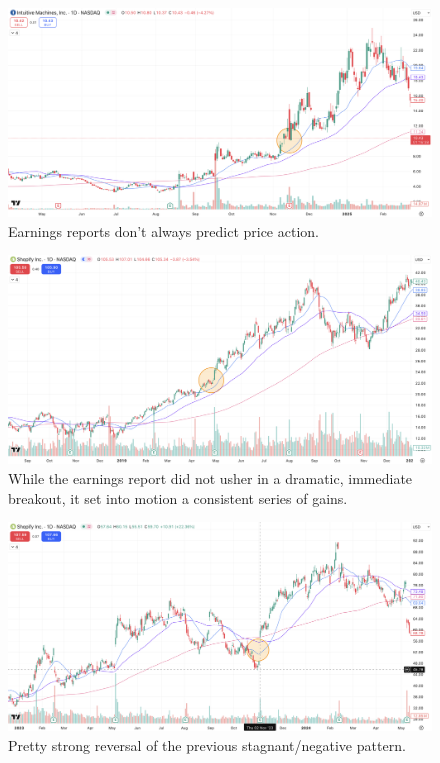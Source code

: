 \documentclass[11pt]{article}
\begin{document}
    \begin{figure}[H]
        \centering
        \includegraphics[width=1.0\linewidth]{images/LUNR2.png}
        \caption{Earnings reports don't always predict price action.}
        \label{fig:LUNR2}
    \end{figure}

    \begin{figure}[H]
        \centering
        \includegraphics[width=1.0\linewidth]{images/SHOP1.png}
        \caption{While the earnings report did not usher in a dramatic, immediate breakout, it set into motion a consistent series of gains.}
        \label{fig:SHOP1}
    \end{figure}

    \begin{figure}[H]
        \centering
        \includegraphics[width=1.0\linewidth]{images/SHOP2.png}
        \caption{Pretty strong reversal of the previous stagnant/negative pattern.}
        \label{fig:SHOP2}
    \end{figure}
\end{document}
